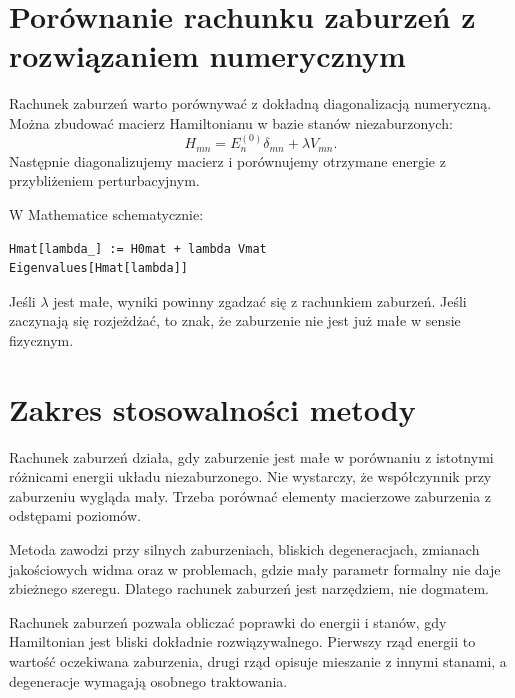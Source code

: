 \section{Porównanie rachunku zaburzeń z rozwiązaniem numerycznym}

Rachunek zaburzeń warto porównywać z dokładną diagonalizacją numeryczną. Można zbudować macierz Hamiltonianu w bazie stanów niezaburzonych:
\begin{equation}
    H_{mn}=E_n^{(0)}\delta_{mn}+\lambda V_{mn}.
\end{equation}
Następnie diagonalizujemy macierz i porównujemy otrzymane energie z przybliżeniem perturbacyjnym.

W Mathematice schematycznie:
\begin{verbatim}
Hmat[lambda_] := H0mat + lambda Vmat
Eigenvalues[Hmat[lambda]]
\end{verbatim}
Jeśli \(\lambda\) jest małe, wyniki powinny zgadzać się z rachunkiem zaburzeń. Jeśli zaczynają się rozjeżdżać, to znak, że zaburzenie nie jest już małe w sensie fizycznym.

\section{Zakres stosowalności metody}

Rachunek zaburzeń działa, gdy zaburzenie jest małe w porównaniu z istotnymi różnicami energii układu niezaburzonego. Nie wystarczy, że współczynnik przy zaburzeniu wygląda mały. Trzeba porównać elementy macierzowe zaburzenia z odstępami poziomów.

Metoda zawodzi przy silnych zaburzeniach, bliskich degeneracjach, zmianach jakościowych widma oraz w problemach, gdzie mały parametr formalny nie daje zbieżnego szeregu. Dlatego rachunek zaburzeń jest narzędziem, nie dogmatem.

\begin{summarybox}
Rachunek zaburzeń pozwala obliczać poprawki do energii i stanów, gdy Hamiltonian jest bliski dokładnie rozwiązywalnego. Pierwszy rząd energii to wartość oczekiwana zaburzenia, drugi rząd opisuje mieszanie z innymi stanami, a degeneracje wymagają osobnego traktowania.
\end{summarybox}
